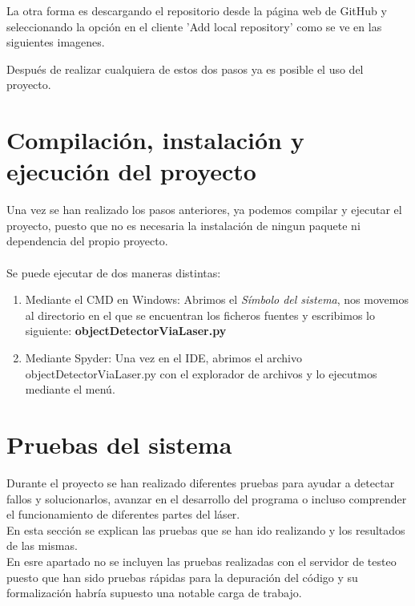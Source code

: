 La otra forma es descargando el repositorio desde la página web de GitHub y seleccionando la opción en el cliente 'Add local repository' como se ve en las siguientes imagenes.\\


Después de realizar cualquiera de estos dos pasos ya es posible el uso del proyecto.\\


\section{Compilación, instalación y ejecución del proyecto}
Una vez se han realizado los pasos anteriores, ya podemos compilar y ejecutar el proyecto, puesto que no es necesaria la instalación de ningun paquete ni dependencia del propio proyecto.\\
\\
Se puede ejecutar de dos maneras distintas:
\begin{enumerate}
	\item Mediante el CMD en Windows: Abrimos el \textit{Símbolo del sistema}, nos movemos al directorio en el que se encuentran los ficheros fuentes y escribimos lo siguiente: \textbf{objectDetectorViaLaser.py}
	
	\item Mediante Spyder: Una vez en el IDE, abrimos el archivo objectDetectorViaLaser.py con el explorador de archivos y lo ejecutmos mediante el menú.
\end{enumerate}



\section{Pruebas del sistema}
Durante el proyecto se han realizado diferentes pruebas para ayudar a detectar fallos y solucionarlos, avanzar en el desarrollo del programa o incluso comprender el funcionamiento de diferentes partes del láser.\\ En esta sección se explican las pruebas que se han ido realizando y los resultados de las mismas.
\\

En esre apartado no se incluyen las pruebas realizadas con el servidor de testeo puesto que han sido pruebas rápidas para la depuración del código y su formalización habría supuesto una notable carga de trabajo.

